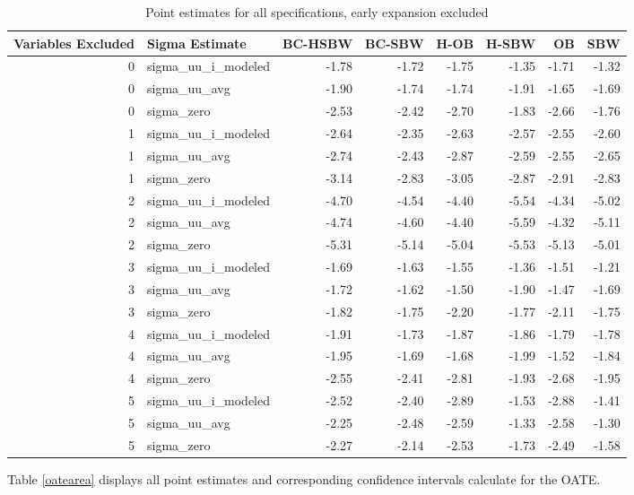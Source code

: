 \documentclass[12pt]{article}
\begin{document}
\begin{table}[ht]
\centering
\begin{tabular}{rlrrrrrr}
  \hline
Variables Excluded & Sigma Estimate & BC-HSBW & BC-SBW & H-OB & H-SBW & OB & SBW \\ 
  \hline
0 & sigma\_uu\_i\_modeled & -1.78 & -1.72 & -1.75 & -1.35 & -1.71 & -1.32 \\ 
  0 & sigma\_uu\_avg & -1.90 & -1.74 & -1.74 & -1.91 & -1.65 & -1.69 \\ 
  0 & sigma\_zero & -2.53 & -2.42 & -2.70 & -1.83 & -2.66 & -1.76 \\ 
  1 & sigma\_uu\_i\_modeled & -2.64 & -2.35 & -2.63 & -2.57 & -2.55 & -2.60 \\ 
  1 & sigma\_uu\_avg & -2.74 & -2.43 & -2.87 & -2.59 & -2.55 & -2.65 \\ 
  1 & sigma\_zero & -3.14 & -2.83 & -3.05 & -2.87 & -2.91 & -2.83 \\ 
  2 & sigma\_uu\_i\_modeled & -4.70 & -4.54 & -4.40 & -5.54 & -4.34 & -5.02 \\ 
  2 & sigma\_uu\_avg & -4.74 & -4.60 & -4.40 & -5.59 & -4.32 & -5.11 \\ 
  2 & sigma\_zero & -5.31 & -5.14 & -5.04 & -5.53 & -5.13 & -5.01 \\ 
  3 & sigma\_uu\_i\_modeled & -1.69 & -1.63 & -1.55 & -1.36 & -1.51 & -1.21 \\ 
  3 & sigma\_uu\_avg & -1.72 & -1.62 & -1.50 & -1.90 & -1.47 & -1.69 \\ 
  3 & sigma\_zero & -1.82 & -1.75 & -2.20 & -1.77 & -2.11 & -1.75 \\ 
  4 & sigma\_uu\_i\_modeled & -1.91 & -1.73 & -1.87 & -1.86 & -1.79 & -1.78 \\ 
  4 & sigma\_uu\_avg & -1.95 & -1.69 & -1.68 & -1.99 & -1.52 & -1.84 \\ 
  4 & sigma\_zero & -2.55 & -2.41 & -2.81 & -1.93 & -2.68 & -1.95 \\ 
  5 & sigma\_uu\_i\_modeled & -2.52 & -2.40 & -2.89 & -1.53 & -2.88 & -1.41 \\ 
  5 & sigma\_uu\_avg & -2.25 & -2.48 & -2.59 & -1.33 & -2.58 & -1.30 \\ 
  5 & sigma\_zero & -2.27 & -2.14 & -2.53 & -1.73 & -2.49 & -1.58 \\ 
   \hline
\end{tabular}
   \label{pointesttablec2}
   \caption{Point estimates for all specifications, early expansion excluded}
\end{table}

Table \ref{oatearea} displays all point estimates and corresponding confidence intervals calculate for the OATE.
\end{document}

